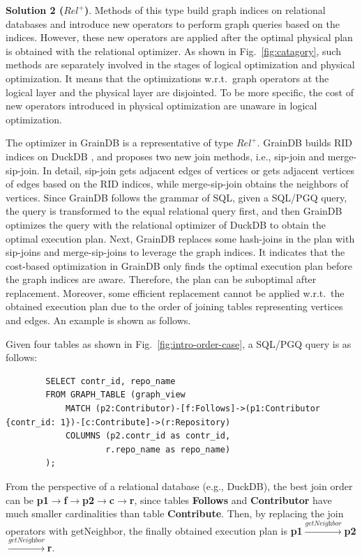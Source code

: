 {\textbf{Solution 2 ($Rel^+$)}.
Methods of this type build graph indices on relational databases and introduce new operators to perform graph queries based on the indices.
However, these new operators are applied after the optimal physical plan is obtained with the relational optimizer.
As shown in Fig.~\ref{fig:catagory}, such methods are separately involved in the stages of logical optimization and physical optimization.
It means that the optimizations w.r.t.~graph operators at the logical layer and the physical layer are disjointed.
To be more specific, the cost of new operators introduced in physical optimization are unaware in logical optimization.

The optimizer in GrainDB \cite{graindb} is a representative of type $Rel^+$.
GrainDB builds RID indices on DuckDB \cite{duckdb}, and proposes two new join methods, i.e., sip-join and merge-sip-join.
In detail, sip-join gets adjacent edges of vertices or gets adjacent vertices of edges based on the RID indices, while merge-sip-join obtains the neighbors of vertices.
Since GrainDB follows the grammar of SQL, given a SQL/PGQ query, the query is transformed to the equal relational query first, and then GrainDB optimizes the query with the relational optimizer of DuckDB to obtain the optimal execution plan.
Next, GrainDB replaces some hash-joins in the plan with sip-joins and merge-sip-joins to leverage the graph indices.
It indicates that the cost-based optimization in GrainDB only finds the optimal execution plan before the graph indices are aware.
Therefore, the plan can be suboptimal after replacement.
Moreover, some efficient replacement cannot be applied w.r.t.~the obtained execution plan due to the order of joining tables representing vertices and edges.
An example is shown as follows.

\begin{example}
    Given four tables as shown in Fig.~\ref{fig:intro-order-case}, a SQL/PGQ query is as follows:
    \begin{lstlisting}
        SELECT contr_id, repo_name
        FROM GRAPH_TABLE (graph_view
            MATCH (p2:Contributor)-[f:Follows]->(p1:Contributor {contr_id: 1})-[c:Contribute]->(r:Repository)
            COLUMNS (p2.contr_id as contr_id,
                    r.repo_name as repo_name)
        );
    \end{lstlisting}
    From the perspective of a relational database (e.g., DuckDB), the best join order can be \textbf{p1$\rightarrow$f$\rightarrow$p2$\rightarrow$c$\rightarrow$r}, since tables \textbf{Follows} and \textbf{Contributor} have much smaller cardinalities than table \textbf{Contribute}.
    Then, by replacing the join operators with getNeighbor, the finally obtained execution plan is \textbf{p1$\xrightarrow{\textit{getNeighbor}}$p2$\xrightarrow{\textit{getNeighbor}}$r}.


\end{example}}
